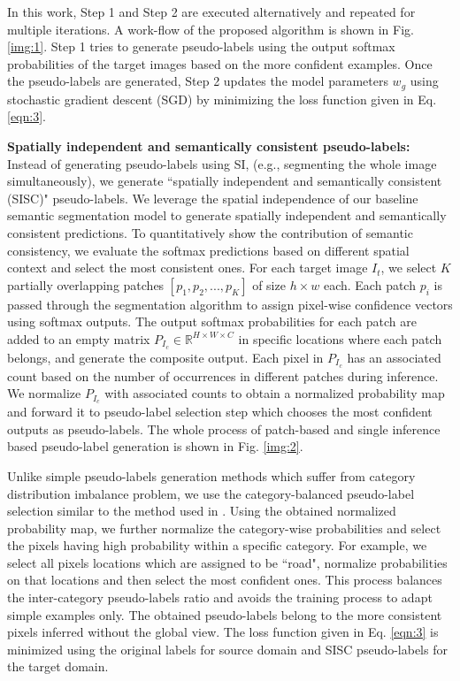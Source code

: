 \documentclass[10pt,twocolumn,letterpaper]{article}
\begin{document}
In this work, Step 1 and Step 2 are executed alternatively and repeated for multiple iterations. A work-flow of the proposed algorithm is shown in Fig. \ref{img:1}. Step 1 tries to generate pseudo-labels using the output softmax probabilities of the target images based on the more confident examples. Once the pseudo-labels are generated, Step 2 updates the model parameters $w_g$ using stochastic gradient descent (SGD) by minimizing the loss function given in Eq. \ref{eqn:3}. 

\textbf{Spatially independent and semantically consistent pseudo-labels:} Instead of generating pseudo-labels using SI, (e.g., segmenting the whole image simultaneously), we generate ``spatially independent and semantically consistent (SISC)" pseudo-labels. We leverage the spatial independence of our baseline semantic segmentation model to generate spatially independent and semantically consistent predictions. 
To quantitatively show the contribution of semantic consistency, we evaluate the softmax predictions based on different spatial context and select the most consistent ones. For each target image $I_t$, we select $K$ partially overlapping patches $[{p_1, p_2,...,p_K}]$ of size $h \times w$ each. Each patch $p_i$ is passed through the segmentation algorithm to assign pixel-wise confidence vectors using softmax outputs. 
The output softmax probabilities for each patch are added to an empty matrix $P_{I_c} \in \mathbb{R} ^{H\times W\times C}$ in specific locations where each patch belongs, and generate the composite output. Each pixel in $P_{I_c}$ has an associated count based on the number of occurrences in different patches during inference. We normalize $P_{I_c}$ with associated counts to obtain a normalized probability map and forward it to pseudo-label selection step which chooses the most confident outputs as pseudo-labels. The whole process of patch-based and single inference based pseudo-label generation is shown in Fig. \ref{img:2}. 



Unlike simple pseudo-labels generation methods which suffer from category distribution imbalance problem, we use the category-balanced pseudo-label selection similar to the method used in \cite{zou2018unsupervised}. Using the obtained normalized probability map, we further normalize the category-wise probabilities and select the pixels having high probability within a specific category. For example, we select all pixels locations which are assigned to be ``road", normalize probabilities on that locations and then select the most confident ones. 
This process balances the inter-category pseudo-labels ratio and avoids the training process to adapt simple examples only. The obtained pseudo-labels belong to the more consistent pixels inferred without the global view. The loss function given in Eq. \ref{eqn:3} is minimized using the original labels for source domain and SISC pseudo-labels for the target domain. 
\end{document}
